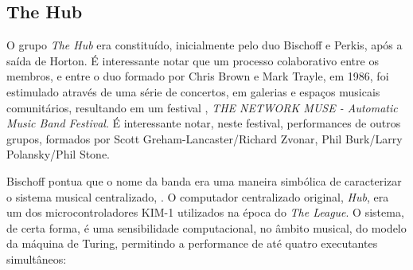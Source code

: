 \subsection{The Hub}

O grupo \emph{The Hub} era constituído, inicialmente pelo duo Bischoff e Perkis, após a saída de Horton. É interessante notar que um processo colaborativo entre os membros, e entre o duo formado por Chris Brown e Mark Trayle, em 1986, foi estimulado através de  uma série de concertos, em galerias e espaços musicais comunitários, resultando em um festival , \emph{THE NETWORK MUSE - Automatic Music Band Festival}. É interessante notar, neste festival, performances de outros grupos, formados por Scott Greham-Lancaster/Richard Zvonar, Phil Burk/Larry Polansky/Phil Stone.

Bischoff pontua que o nome da banda era uma maneira simbólica de caracterizar o sistema musical centralizado, . O computador centralizado original, \emph{Hub}, era um dos microcontroladores KIM-1 utilizados na época do \emph{The League}. O sistema, de certa forma, é uma sensibilidade computacional, no âmbito musical, do modelo da máquina de Turing, permitindo a performance de até quatro executantes simultâneos:  

